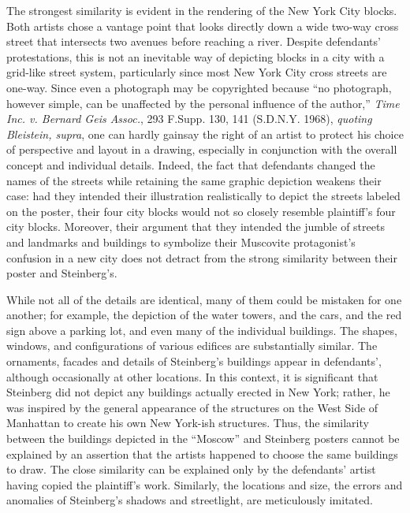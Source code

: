 The strongest similarity is evident in the rendering of the New York City
blocks. Both artists chose a vantage point that looks directly down a wide
two-way cross street that intersects two avenues before reaching a river.
Despite defendants' protestations, this is not an inevitable way of depicting
blocks in a city with a grid-like street system, particularly since most New
York City cross streets are one-way. Since even a photograph may be copyrighted
because ``no photograph, however simple, can be unaffected by the personal
influence of the author,'' \textit{Time Inc. v. Bernard Geis Assoc.}, 293
F.Supp. 130, 141 (S.D.N.Y. 1968), \textit{quoting} \textit{Bleistein,
supra}\textit{}, one can hardly gainsay the right of an artist to protect his
choice of perspective and layout in a drawing, especially in conjunction with
the overall concept and individual details. Indeed, the fact that defendants
changed the names of the streets while retaining the same graphic depiction
weakens their case: had they intended their illustration realistically to depict
the streets labeled on the poster, their four city blocks would not so closely
resemble plaintiff's four city blocks. Moreover, their argument that they
intended the jumble of streets and landmarks and buildings to symbolize their
Muscovite protagonist's confusion in a new city does not detract from the strong
similarity between their poster and Steinberg's.

 While not all of the details are identical, many of them could be mistaken for
one another; for example, the depiction of the water towers, and the cars, and
the red sign above a parking lot, and even many of the individual buildings. The
shapes, windows, and configurations of various edifices are substantially
similar. The ornaments, facades and details of Steinberg's buildings appear in
defendants', although occasionally at other locations. In this context, it is
significant that Steinberg did not depict any buildings actually erected in New
York; rather, he was inspired by the general appearance of the structures on the
West Side of Manhattan to create his own New York-ish structures. Thus, the
similarity between the buildings depicted in the ``Moscow'' and Steinberg
posters cannot be explained by an assertion that the artists happened to choose
the same buildings to draw. The close similarity can be explained only by the
defendants' artist having copied the plaintiff's work. Similarly, the locations
and size, the errors and anomalies of Steinberg's shadows and streetlight, are
meticulously imitated.

